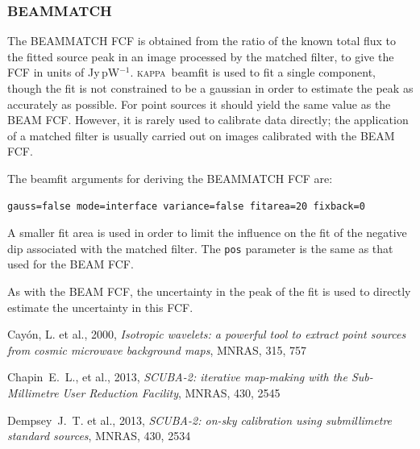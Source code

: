 \documentclass[twoside,11pt]{article}
\renewcommand{\_}{\texttt{\symbol{95}}}
\newcommand{\KAPPA}{\textsc{kappa}}
\newcommand{\task}[1]{\textsf{#1}}
\begin{document}
\subsubsection{BEAMMATCH}

The BEAMMATCH FCF is obtained from the ratio of the known total flux
to the fitted source peak in an image processed by the matched filter,
to give the FCF in units of Jy\,pW$^{-1}$. \KAPPA\ \task{beamfit} is
used to fit a single component, though the fit is not constrained to
be a gaussian in order to estimate the peak as accurately as
possible. For point sources it should yield the same value as the BEAM
FCF. However, it is rarely used to calibrate data directly; the
application of a matched filter is usually carried out on images
calibrated with the BEAM FCF.

The \task{beamfit} arguments for deriving the BEAMMATCH FCF are:
\begin{verbatim}
gauss=false mode=interface variance=false fitarea=20 fixback=0
\end{verbatim}
A smaller fit area is used in order to limit the influence on the fit
of the negative dip associated with the matched filter. The \verb+pos+
parameter is the same as that used for the BEAM FCF.

As with the BEAM FCF, the uncertainty in the peak of the fit is used
to directly estimate the uncertainty in this FCF.



\begin{thebibliography}{}
 Cay{\'o}n, L. et al., 2000, \textit{Isotropic
    wavelets: a powerful tool to extract point sources from cosmic
    microwave background maps}, MNRAS, 315, 757

Chapin~E.~L., et al., 2013, \textit{SCUBA-2: iterative map-making with
  the Sub-Millimetre User Reduction Facility}, MNRAS, 430, 2545

Dempsey~J.~T. et al., 2013, \textit{SCUBA-2: on-sky calibration using
  submillimetre standard sources}, MNRAS, 430, 2534
\end{thebibliography}

\newpage
\appendix
\end{document}
